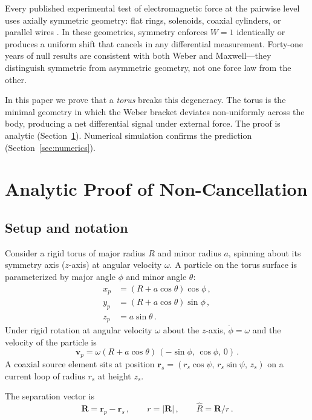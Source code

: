\documentclass[12pt,preprint,amsmath,amssymb]{revtex4-2}
\begin{document}
Every published experimental test of electromagnetic force at the pairwise level
uses axially symmetric geometry: flat rings, solenoids, coaxial cylinders, or parallel
wires \cite{lemon2022,tajmar2004,hayasaka1989}. In these geometries, symmetry enforces
$W = 1$ identically or produces a uniform shift that cancels in any differential measurement.
Forty-one years of null results are consistent with both Weber and Maxwell---they
distinguish symmetric from asymmetric geometry, not one force law from the other.

In this paper we prove that a \emph{torus} breaks this degeneracy.
The torus is the minimal geometry in which the Weber bracket deviates non-uniformly
across the body, producing a net differential signal under external force.
The proof is analytic (Section~\ref{sec:proof}). Numerical simulation confirms
the prediction (Section~\ref{sec:numerics}).

\section{Analytic Proof of Non-Cancellation}
\label{sec:proof}

\subsection{Setup and notation}

Consider a rigid torus of major radius $R$ and minor radius $a$, spinning about its
symmetry axis ($z$-axis) at angular velocity $\omega$. A particle on the torus surface
is parameterized by major angle $\phi$ and minor angle $\theta$:
\begin{align}
x_p &= (R + a\cos\theta)\cos\phi\,, \label{eq:xp} \\
y_p &= (R + a\cos\theta)\sin\phi\,, \label{eq:yp} \\
z_p &= a\sin\theta\,. \label{eq:zp}
\end{align}
Under rigid rotation at angular velocity $\omega$ about the $z$-axis,
$\dot{\phi} = \omega$ and the velocity of the particle is
\begin{equation}
\label{eq:vel}
\mathbf{v}_p = \omega(R + a\cos\theta)\,(-\sin\phi,\,\cos\phi,\,0)\,.
\end{equation}
A coaxial source element sits at position $\mathbf{r}_s = (r_s\cos\psi,\,r_s\sin\psi,\,z_s)$
on a current loop of radius $r_s$ at height $z_s$.

The separation vector is
\begin{equation}
\mathbf{R} = \mathbf{r}_p - \mathbf{r}_s\,,\qquad r = |\mathbf{R}|\,,\qquad \hat{R} = \mathbf{R}/r\,.
\end{equation}
\end{document}
